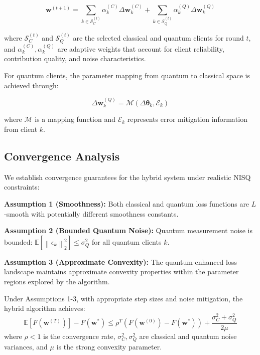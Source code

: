 \documentclass[10pt,journal,compsoc]{IEEEtran}
\newcommand{\vect}[1]{\mathbf{#1}}
\newcommand{\norm}[1]{\left\|#1\right\|}
\newcommand{\expect}[1]{\mathbb{E}\left[#1\right]}
\begin{document}
\begin{equation}
\vect{w}^{(t+1)} = \sum_{k \in \mathcal{S}_C^{(t)}} \alpha_k^{(C)} \Delta \vect{w}_k^{(C)} + \sum_{k \in \mathcal{S}_Q^{(t)}} \alpha_k^{(Q)} \Delta \vect{w}_k^{(Q)}
\label{eq:hybrid_aggregation}
\end{equation}

where $\mathcal{S}_C^{(t)}$ and $\mathcal{S}_Q^{(t)}$ are the selected classical and quantum clients for round $t$, and $\alpha_k^{(C)}, \alpha_k^{(Q)}$ are adaptive weights that account for client reliability, contribution quality, and noise characteristics.

For quantum clients, the parameter mapping from quantum to classical space is achieved through:

\begin{equation}
\Delta \vect{w}_k^{(Q)} = \mathcal{M}(\Delta \boldsymbol{\theta}_k, \mathcal{E}_k)
\label{eq:parameter_mapping}
\end{equation}

where $\mathcal{M}$ is a mapping function and $\mathcal{E}_k$ represents error mitigation information from client $k$.

\subsection{Convergence Analysis}

We establish convergence guarantees for the hybrid system under realistic NISQ constraints:

\textbf{Assumption 1 (Smoothness):} Both classical and quantum loss functions are $L$-smooth with potentially different smoothness constants.

\textbf{Assumption 2 (Bounded Quantum Noise):} Quantum measurement noise is bounded: $\expect{\norm{\epsilon_k}_2^2} \leq \sigma_Q^2$ for all quantum clients $k$.

\textbf{Assumption 3 (Approximate Convexity):} The quantum-enhanced loss landscape maintains approximate convexity properties within the parameter regions explored by the algorithm.

\begin{theorem}
Under Assumptions 1-3, with appropriate step sizes and noise mitigation, the hybrid algorithm achieves:
\begin{equation}
\expect{F(\vect{w}^{(T)})} - F(\vect{w}^*) \leq \rho^T (F(\vect{w}^{(0)}) - F(\vect{w}^*)) + \frac{\sigma_C^2 + \sigma_Q^2}{2\mu}
\label{eq:convergence_bound}
\end{equation}
where $\rho < 1$ is the convergence rate, $\sigma_C^2, \sigma_Q^2$ are classical and quantum noise variances, and $\mu$ is the strong convexity parameter.
\end{theorem}
\end{document}
